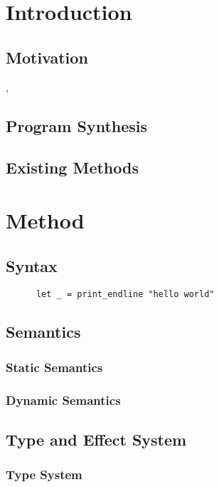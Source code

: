 \documentclass[12pt, a4paper, titlepage]{report}
\begin{document}
\chapter{Introduction} \label{section:introduction}
  \section{Motivation}
    \cite{bodik:2015},
  \section{Program Synthesis}
    \cite{gulwani:2017}
  \section{Existing Methods}

\chapter{Method}\label{section:method}
  \section{Syntax}
    \begin{verbatim}
      let _ = print_endline "hello world"
    \end{verbatim}
  \section{Semantics}
    \subsection{Static Semantics} %
    \subsection{Dynamic Semantics} %
  \section{Type and Effect System}
    \subsection{Type System}
\end{document}
